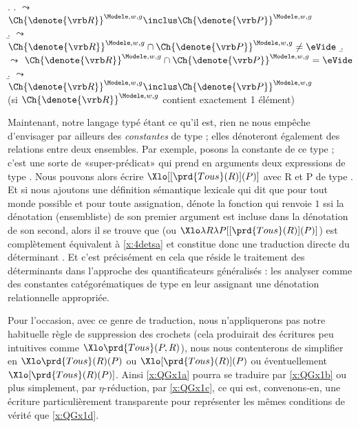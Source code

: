 \ex. \label{x:4dets}
\a.  $\leadsto$   \label{x:4detsa}
\hfill \(\Ch{\denote{\vrb R}}^{\Modele,w,g}\inclus\Ch{\denote{\vrb P}}^{\Modele,w,g} \hphantom{\,=\eVide}\)
\b.  $\leadsto$ 
\hfill \(\Ch{\denote{\vrb R}}^{\Modele,w,g}\cap\Ch{\denote{\vrb P}}^{\Modele,w,g}\neq\eVide\)
\b.
 $\leadsto$ 
\hfill \(\Ch{\denote{\vrb R}}^{\Modele,w,g}\cap\Ch{\denote{\vrb P}}^{\Modele,w,g}=\eVide\)
\b.  $\leadsto$ 
\hfill \(\Ch{\denote{\vrb R}}^{\Modele,w,g}\inclus\Ch{\denote{\vrb P}}^{\Modele,w,g}\hphantom{\,=\eVide}\) 
\\{\vstrab[0pt]}\hfill{\small(si \(\Ch{\denote{\vrb R}}^{\Modele,w,g}\) contient exactement 1 élément)}


\sloppy

Maintenant, notre langage {\LO} typé étant ce qu'il est, rien ne nous empêche d'envisager par ailleurs des \emph{constantes} de type \type{\et,\ett} ; elles dénoteront également des relations entre deux ensembles.
Par exemple, posons la constante  de ce type ; c'est une sorte de «super-prédicat» qui prend en arguments deux expressions de type \et.
Nous pouvons alors écrire \(\Xlo[[\prd{Tous}(R)](P)]\) avec \vrb R et \vrb P de type \et.  Et si nous ajoutons une définition sémantique lexicale qui dit que pour tout monde possible et pour toute assignation,  dénote la fonction qui renvoie $1$ ssi la dénotation (ensembliste) de son premier argument est incluse dans la dénotation de son second, alors il se trouve que  (ou $\Xlo\lambda R\lambda P[[\prd{Tous}(R)](P)]$) est complètement équivalent à \ref{x:4detsa} et constitue donc une traduction directe du déterminant .
Et c'est précisément en cela que réside le traitement des déterminants dans l'approche  des quantificateurs généralisés : les analyser  comme des constantes catégorématiques de type \type{\et,\ett} en leur assignant une dénotation relationnelle appropriée.

\fussy

Pour l'occasion, avec ce genre de traduction, nous n'appliquerons pas notre habituelle règle de suppression des crochets (cela produirait des écritures peu intuitives comme \(\Xlo\prd{Tous}(P,R)\)), nous nous contenterons de simplifier en \(\Xlo\prd{Tous}(R)(P)\) ou \(\Xlo[\prd{Tous}(R)](P)\) ou éventuellement \(\Xlo[\prd{Tous}(R)(P)]\).
Ainsi \ref{x:QGx1a} pourra se traduire par \ref{x:QGx1b} ou plus simplement, par $\eta$-réduction, par \ref{x:QGx1c}, ce qui est, convenons-en, une écriture particulièrement transparente pour représenter les mêmes conditions de vérité que \ref{x:QGx1d}.


